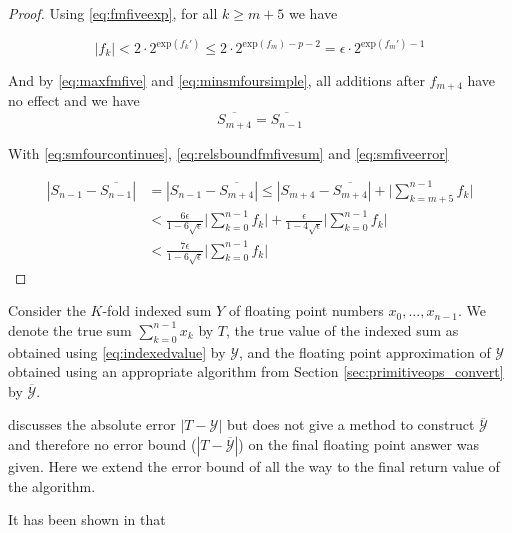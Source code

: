 \documentclass[12pt]{article}
\providecommand{\exp}{\ensuremath{\text{exp}}}
\theoremstyle{definition}
\numberwithin{equation}{section}
\numberwithin{figure}{section}
\begin{document}
\begin{proof}
        Using  \eqref{eq:fmfiveexp}, for all $k \geq m + 5$ we have

        \begin{equation}
          |f_k| < 2 \cdot 2^{\exp(f_k')} \leq 2 \cdot 2^{\exp(f_m) - p - 2} = \epsilon \cdot 2^{\exp(f_m') - 1}
          \label{eq:maxfmfive}
        \end{equation}

        And by  \eqref{eq:maxfmfive} and \eqref{eq:minsmfoursimple}, all additions after $f_{m + 4}$ have no effect and we have
        \begin{equation}
          \overline{S_{m + 4}} = \overline{S_{n - 1}}
          \label{eq:smfourcontinues}
        \end{equation}

        With  \eqref{eq:smfourcontinues}, \eqref{eq:relsboundfmfivesum} and \eqref{eq:smfiveerror}

        \begin{align*}
          \left|S_{n - 1} - \overline{S_{n - 1}}\right| &= \left|S_{n - 1} - \overline{S_{m + 4}}\right| \leq \left|S_{m + 4} - \overline{S_{m + 4}}\right| + \bigl|\sum\limits_{k = m + 5}^{n - 1}f_k\bigr| \\
          &< \frac{6\epsilon}{1 - 6\sqrt\epsilon}\bigl|\sum\limits_{k = 0}^{n - 1}f_k\bigr| + \frac{\epsilon}{1 - 4\sqrt\epsilon}\bigl|\sum\limits_{k = 0}^{n - 1} f_k\bigr| \\
          &< \frac{7\epsilon}{1 - 6\sqrt\epsilon}\bigl|\sum\limits_{k = 0}^{n - 1}f_k\bigr|
        \end{align*}
    \end{proof}

    Consider the $K$-fold indexed sum $Y$ of floating point numbers $x_0, ..., x_{n - 1}$. We denote the true sum $\sum \limits_{k = 0}^{n - 1} x_k$ by $T$, the true value of the indexed sum as obtained using  \eqref{eq:indexedvalue} by $\mathcal{Y}$, and the floating point approximation of $\mathcal{Y}$ obtained using an appropriate algorithm from Section \ref{sec:primitiveops_convert} by $\overline{\mathcal{Y}}$.

    \cite{repsum} discusses the absolute error $|T - \mathcal{Y}|$ but does not give a method to construct $\overline{\mathcal{Y}}$ and therefore no error bound ($|T - \overline{\mathcal{Y}}|$) on the final floating point answer was given. Here we extend the error bound of \cite{repsum} all the way to the final return value of the algorithm.

    It has been shown in \cite{repsum} that
\end{document}
